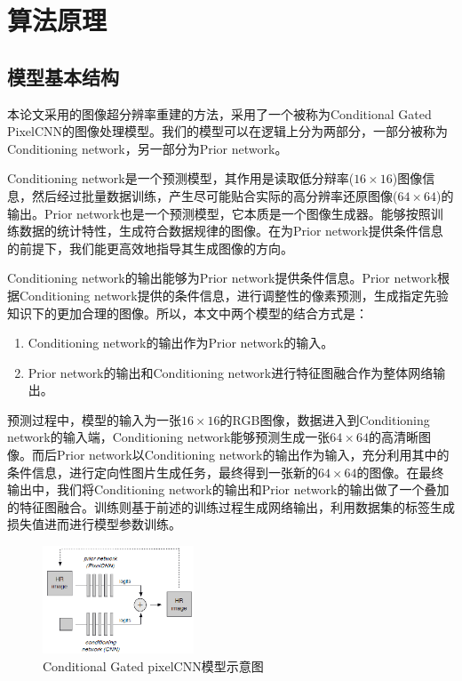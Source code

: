 \section{算法原理}
\subsection{模型基本结构}

本论文采用的图像超分辨率重建的方法，采用了一个被称为Conditional Gated PixelCNN的图像处理模型。我们的模型可以在逻辑上分为两部分，一部分被称为Conditioning network，另一部分为Prior network。

Conditioning network是一个预测模型，其作用是读取低分辩率($16\times16$)图像信息，然后经过批量数据训练，产生尽可能贴合实际的高分辨率还原图像($64\times64$)的输出。Prior network也是一个预测模型，它本质是一个图像生成器。能够按照训练数据的统计特性，生成符合数据规律的图像。在为Prior network提供条件信息的前提下，我们能更高效地指导其生成图像的方向。

Conditioning network的输出能够为Prior network提供条件信息。Prior network根据Conditioning network提供的条件信息，进行调整性的像素预测，生成指定先验知识下的更加合理的图像。所以，本文中两个模型的结合方式是：

\begin{enumerate}
    \item Conditioning network的输出作为Prior network的输入。
    \item Prior network的输出和Conditioning network进行特征图融合作为整体网络输出。
\end{enumerate}

预测过程中，模型的输入为一张$16\times 16$的RGB图像，数据进入到Conditioning network的输入端，Conditioning network能够预测生成一张$64\times 64$的高清晰图像。而后Prior network以Conditioning network的输出作为输入，充分利用其中的条件信息，进行定向性图片生成任务，最终得到一张新的$64\times 64$的图像。在最终输出中，我们将Conditioning network的输出和Prior network的输出做了一个叠加的特征图融合。训练则基于前述的训练过程生成网络输出，利用数据集的标签生成损失值进而进行模型参数训练。

\begin{figure}[htp]
    \centering
    \includegraphics[width=0.4\textwidth]{figures/network}
    \caption{Conditional Gated pixelCNN模型示意图}
\end{figure}


